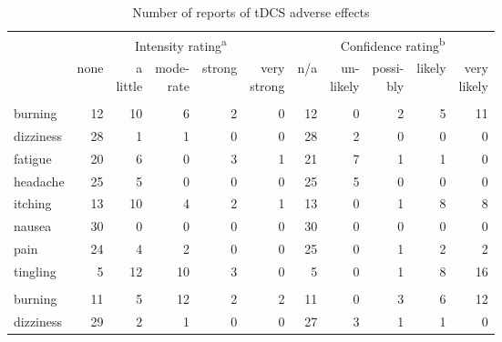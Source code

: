 \documentclass[11pt,]{memoir}
\begin{document}
\begin{longtable}{lrrrrrrrrrr}
\caption{\label{tab:tab-sacc-tDCS-AE}Number of reports of tDCS adverse effects}\\
\toprule
\multicolumn{1}{c}{ } & \multicolumn{5}{c}{Intensity rating\textsuperscript{a}} & \multicolumn{5}{c}{Confidence rating\textsuperscript{b}} \\
\cmidrule(l{3pt}r{3pt}){2-6} \cmidrule(l{3pt}r{3pt}){7-11}
  & none & \makecell[c]{a\\little} & \makecell[c]{mode-\\rate} & strong & \makecell[c]{very\\strong} & n/a & \makecell[c]{un-\\likely} & \makecell[c]{possi-\\bly} & likely & \makecell[c]{very\\likely}\\
\midrule
\addlinespace[0.3em]
\multicolumn{11}{l}{\textbf{anodal session}}\\
\hspace{1em}burning & 12 & 10 & 6 & 2 & 0 & 12 & 0 & 2 & 5 & 11\\
\hspace{1em}dizziness & 28 & 1 & 1 & 0 & 0 & 28 & 2 & 0 & 0 & 0\\
\hspace{1em}fatigue & 20 & 6 & 0 & 3 & 1 & 21 & 7 & 1 & 1 & 0\\
\hspace{1em}headache & 25 & 5 & 0 & 0 & 0 & 25 & 5 & 0 & 0 & 0\\
\hspace{1em}itching & 13 & 10 & 4 & 2 & 1 & 13 & 0 & 1 & 8 & 8\\
\hspace{1em}nausea & 30 & 0 & 0 & 0 & 0 & 30 & 0 & 0 & 0 & 0\\
\hspace{1em}pain & 24 & 4 & 2 & 0 & 0 & 25 & 0 & 1 & 2 & 2\\
\hspace{1em}tingling & 5 & 12 & 10 & 3 & 0 & 5 & 0 & 1 & 8 & 16\\
\addlinespace[0.3em]
\multicolumn{11}{l}{\textbf{cathodal session}}\\
\hspace{1em}burning & 11 & 5 & 12 & 2 & 2 & 11 & 0 & 3 & 6 & 12\\
\hspace{1em}dizziness & 29 & 2 & 1 & 0 & 0 & 27 & 3 & 1 & 1 & 0\\

\end{longtable}
\end{document}
